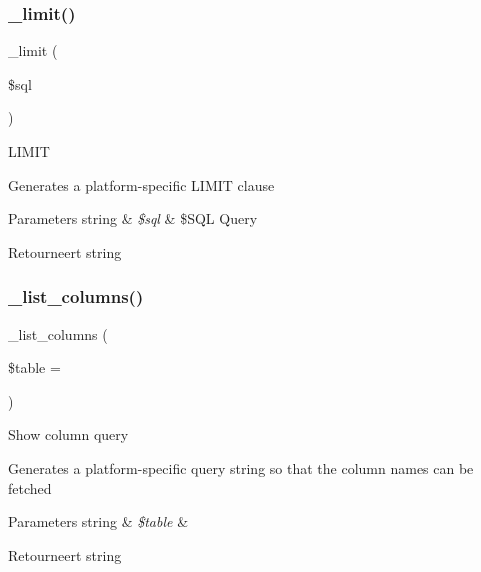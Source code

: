\subsubsection{\texorpdfstring{\_limit()}{\_limit()}}
{\footnotesize\ttfamily \+\_\+limit (\begin{DoxyParamCaption}\item[{}]{\$sql }\end{DoxyParamCaption})\hspace{0.3cm}{\ttfamily [protected]}}

L\+I\+M\+IT

Generates a platform-\/specific L\+I\+M\+IT clause


\begin{DoxyParams}[1]{Parameters}
string & {\em \$sql} & \$\+S\+QL Query \\
\hline
\end{DoxyParams}
\begin{DoxyReturn}{Retourneert}
string 
\end{DoxyReturn}
\mbox{\label{class_c_i___d_b__pdo__informix__driver_a7ccb7f9c301fe7f0a9db701254142b63}} 
\subsubsection{\texorpdfstring{\_list\_columns()}{\_list\_columns()}}
{\footnotesize\ttfamily \+\_\+list\+\_\+columns (\begin{DoxyParamCaption}\item[{}]{\$table = {\ttfamily \textquotesingle{}\textquotesingle{}} }\end{DoxyParamCaption})\hspace{0.3cm}{\ttfamily [protected]}}

Show column query

Generates a platform-\/specific query string so that the column names can be fetched


\begin{DoxyParams}[1]{Parameters}
string & {\em \$table} & \\
\hline
\end{DoxyParams}
\begin{DoxyReturn}{Retourneert}
string 
\end{DoxyReturn}
\mbox{\label{class_c_i___d_b__pdo__informix__driver_a435c0f3ce54fe7daa178baa8532ebd54}} 
